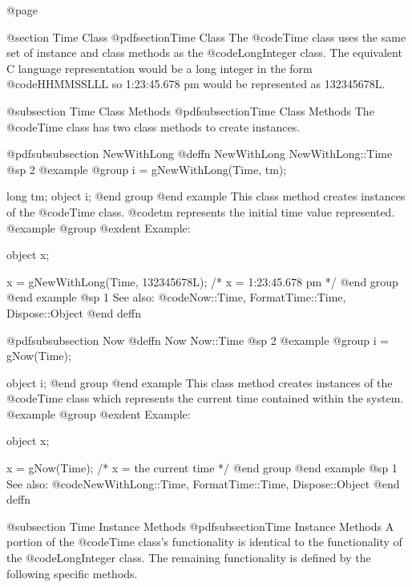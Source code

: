 @page

@section Time Class
@pdfsection{Time Class}
The @code{Time} class uses the same set of instance and class
methods as the @code{LongInteger} class.  The equivalent C language
representation would be a long integer in the form @code{HHMMSSLLL}
so 1:23:45.678 pm would be represented as 132345678L.





@subsection Time Class Methods
@pdfsubsection{Time Class Methods}
The @code{Time} class has two class methods to create instances.






@pdfsubsubsection {NewWithLong}
@deffn {NewWithLong} NewWithLong::Time
@sp 2
@example
@group
i = gNewWithLong(Time, tm);

long    tm;
object  i;
@end group
@end example
This class method creates instances of the @code{Time} class.  @code{tm}
represents the initial time value represented.
@example
@group
@exdent Example:

object  x;

x = gNewWithLong(Time, 132345678L);  /* x = 1:23:45.678 pm  */
@end group
@end example
@sp 1
See also:  @code{Now::Time, FormatTime::Time, Dispose::Object}
@end deffn










@pdfsubsubsection {Now}
@deffn {Now} Now::Time
@sp 2
@example
@group
i = gNow(Time);

object  i;
@end group
@end example
This class method creates instances of the @code{Time} class which
represents the current time contained within the system.
@example
@group
@exdent Example:

object  x;

x = gNow(Time);   /*  x = the current time  */
@end group
@end example
@sp 1
See also:  @code{NewWithLong::Time, FormatTime::Time, Dispose::Object}
@end deffn










@subsection Time Instance Methods
@pdfsubsection{Time Instance Methods}
A portion of the @code{Time} class's functionality is identical to
the functionality of the @code{LongInteger} class.  The remaining
functionality is defined by the following specific methods.







